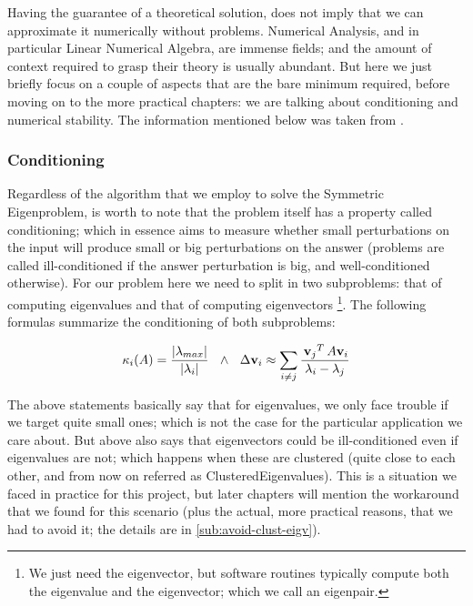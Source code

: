Having the guarantee of a theoretical solution, does not imply that we
can approximate it numerically without problems. Numerical Analysis,
and in particular Linear Numerical 
Algebra, are immense fields; and the amount of context required to grasp
their theory is usually abundant. But here we just briefly focus on a couple of
aspects that are the bare minimum required, before moving on to the more
practical chapters: we are talking about conditioning and numerical
stability. The information mentioned below was taken from
\cite{bindel09}. \\ 

\subsubsection{Conditioning}
Regardless of the algorithm that we employ to solve the Symmetric
Eigenproblem, is worth to note that the problem itself has a property
called conditioning; which in essence aims to measure whether small
perturbations on the input will produce small or big perturbations on the
answer (problems are called ill-conditioned if the answer perturbation
is big, and well-conditioned otherwise). For our problem here we need
to split in two subproblems: 
that of computing eigenvalues and that of computing eigenvectors \footnote{We
just need the eigenvector, but software routines typically compute both the
eigenvalue and the eigenvector; which we call an eigenpair.}. The
following formulas summarize the conditioning of both subproblems:

\begin{equation*}
    \kappa_{i}(A) = \dfrac{\left\lvert \lambda_{max} \right\vert}{\left\lvert \lambda_i \right\vert}
    \,\,\,\,\land\,\,\,\,
    \Delta \mathbf{v}_i \approx \sum\limits_{\tiny{i \ne j}}
    \dfrac{\,{\mathbf{v}_j}^{T}\, A \mathbf{v}_i}{\lambda_i - \lambda_j}  
\end{equation*}
\joinbelow{1cm}

The above statements basically say that for eigenvalues, we only face
trouble if we target quite small ones; which is not the case for the
particular application we care about. But above also says that
eigenvectors could be ill-conditioned even if eigenvalues are not;
which happens when these are clustered (quite close to each
other, and from now on referred as \gls{ClusteredEigenvalues}). This
is a situation we faced in practice for this project, but 
later chapters will mention the workaround that we found for this
scenario (plus the actual, more practical reasons, that we had to avoid
it; the details are in \cref{sub:avoid-clust-eigv}). 

